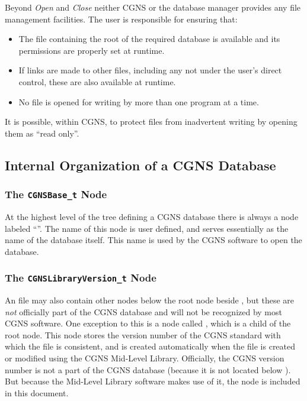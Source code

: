Beyond \textit{Open} and \textit{Close} neither CGNS or the database
manager provides
any file management facilities. The user is responsible for ensuring
that:

\begin{itemize}
\item The file containing the root of the required database is
      available and its permissions are properly set at runtime.
\item If links are made to other files, including any not under the
      user's direct control, these are also available at runtime.
\item No file is opened for writing by more than one program at a time.
\end{itemize}

It is possible, within CGNS, to protect files from inadvertent writing
by opening them as ``read only''.

\subsection{Internal Organization of a CGNS Database}
\label{s:internal}

\subsubsection{The \texttt{CGNSBase\_t} Node}

At the highest level of the tree defining a CGNS database there is
always a node labeled ``''. The name of this
node is user defined, and serves essentially as the name of the
database itself. This name is used by the CGNS software to open the
database.

\subsubsection{The \texttt{CGNSLibraryVersion\_t} Node}

An file may also contain other nodes below the root node beside
, but these are \emph{not} officially part of the
CGNS database and will not be recognized by most CGNS software.
One exception to this is a node called ,
which is a child of the root node.
This node stores the version number of the CGNS standard with which
the file is consistent, and is created automatically when the file is
created or modified using the CGNS Mid-Level Library.
Officially, the CGNS version number is not a part of the CGNS
database (because it is not located below ).
But because the Mid-Level Library software makes use of it, the node is
included in this document.

